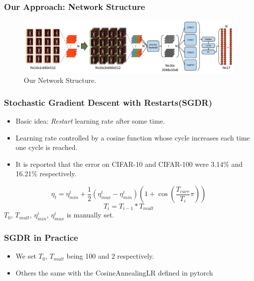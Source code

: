 \documentclass{beamer}
\begin{document}
\begin{frame}
\frametitle{Our Approach: Network Structure}

	\begin{figure}
		\centering
		\includegraphics[width=12cm]{../Pic/Network.pdf}
		\caption{Our Network Structure.}
	\end{figure}

\end{frame}

\begin{frame}
\frametitle{Stochastic Gradient Descent with Restarts(SGDR) \cite{SGDR}}

	\begin{itemize}
		\item Basic idea: \textit{Restart} learning rate after some time.
		\item Learning rate controlled by a cosine function whose cycle increases each time one cycle is reached. 
		\item It is reported that the error on CIFAR-10 and CIFAR-100 were 3.14\% and 16.21\% respectively\cite{SGDR}.
	\end{itemize}
	$$ \eta_t = \eta_{min}^i + \frac{1}{2}(\eta_{max}^i-\eta_{min}^i)(1 + \cos(\frac{T_{curr}}{T_i}\pi))$$
	$$ T_{i} = T_{i-1} * T_{mult} $$
	$T_0$, $T_{mult}$, $\eta_{min}^i$, $\eta_{max}^i$ is manually set.
\end{frame}

\begin{frame}
\frametitle{SGDR in Practice}

	\begin{itemize}
		\item We set $T_0$, $T_{mult}$ being 100 and 2 respectively.
		\item Others the same with the CosineAnnealingLR defined in pytorch
	\end{itemize}

\end{frame}
\end{document}

